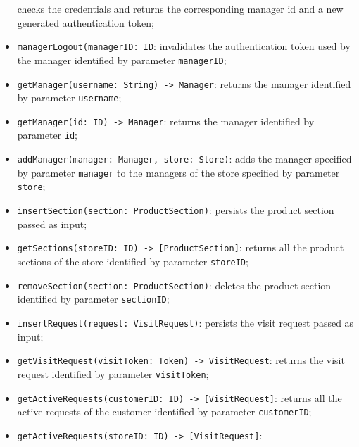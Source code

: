 \documentclass[a4paper,oneside,11pt]{book}
\newcommand{\red}[1]{\begingroup\color{punct}#1\endgroup}
\begin{document}
\begin{itemize}
       checks the credentials and returns the corresponding manager id and a new generated authentication token;
       \item \texttt{managerLogout(managerID: \red{ID}}: \newline
       invalidates the authentication token used by the manager identified by parameter \texttt{managerID};
       \item \texttt{getManager(username: \red{String}) -> \red{Manager}}: \newline returns the manager identified by parameter \texttt{username};
       \item \texttt{getManager(id: \red{ID}) -> \red{Manager}}: \newline
       returns the manager identified by parameter \texttt{id};
       \item \texttt{addManager(manager: \red{Manager}, store: \red{Store})}: \newline
       adds the manager specified by parameter \texttt{manager} to the managers of the store specified by parameter \texttt{store};
       \item \texttt{insertSection(section: \red{ProductSection})}: \newline
       persists the product section passed as input;
       \item \texttt{getSections(storeID: \red{ID}) -> [\red{ProductSection}]}: \newline
       returns all the product sections of the store identified by parameter \texttt{storeID};
       \item \texttt{removeSection(section: \red{ProductSection})}: \newline
       deletes the product section identified by parameter \texttt{sectionID};
       \item \texttt{insertRequest(request: \red{VisitRequest})}: \newline
       persists the visit request passed as input;
       \item \texttt{getVisitRequest(visitToken: \red{Token}) -> \red{VisitRequest}}: \newline
       returns the visit request identified by parameter \texttt{visitToken};
       \item \texttt{getActiveRequests(customerID: \red{ID}) -> [\red{VisitRequest}]}: returns all the active requests of the customer identified by parameter \texttt{customerID};
       \item \texttt{getActiveRequests(storeID: \red{ID}) -> [\red{VisitRequest}]}: \newline

\end{itemize}
\end{document}

